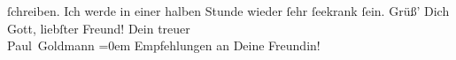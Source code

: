 \begin{ledgroupsized}[t]{13cm}
{{{               }}}\label{K_L02862-2h} ſchreiben.\pend
           \pstart
           Ich werde in einer halben Stunde wieder ſehr ſeekrank ſein.\pend
           \pstart
           Grüß’ Dich Gott, liebſter Freund!\pend
           \pstart
           Dein treuer {\\[\baselineskip]}\spacefill\mbox{Paul Goldmann}\pend
           \leftskip=0em{}\pstart
           \noindent{}Empfehlungen an Deine Freundin!\pend
           
         
         \endnumbering{}\end{ledgroupsized}  \newcommand{\dateiname}{L02862}\newcommand{\titel}{Paul Goldmann an Arthur Schnitzler, 18. 10. [1898]}\newcommand{\editorInnen}{Martin Anton Müller und Laura Untner}
      
